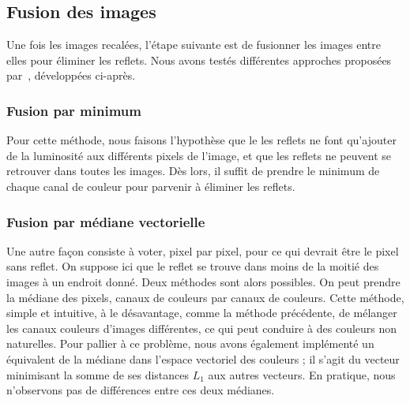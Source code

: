 \documentclass[12pt,a4paper]{article}
\begin{document}
\subsection{Fusion des images}
Une fois les images recalées, l'étape suivante est de fusionner les images entre elles pour éliminer les reflets. Nous avons testés différentes approches proposées par~\citep{haro2012photographing}, développées ci-après.
\subsubsection{Fusion par minimum}
Pour cette méthode, nous faisons l'hypothèse que le les reflets ne font qu'ajouter de la luminosité aux différents pixels de l'image, et que les reflets ne peuvent se retrouver dans toutes les images. Dès lors, il suffit de prendre le minimum de chaque canal de couleur pour parvenir à éliminer les reflets.
\subsubsection{Fusion par médiane vectorielle}
Une autre façon consiste à voter, pixel par pixel, pour ce qui devrait être le pixel sans reflet. On suppose ici que le reflet se trouve dans moins de la moitié des images à un endroit donné. Deux méthodes sont alors possibles. On peut prendre la médiane des pixels, canaux de couleurs par canaux de couleurs. Cette méthode, simple et intuitive, à le désavantage, comme la méthode précédente, de mélanger les canaux couleurs d'images différentes, ce qui peut conduire à des couleurs non naturelles. Pour pallier à ce problème, nous avons également implémenté un équivalent de la médiane dans l'espace vectoriel des couleurs ; il s'agit du vecteur minimisant la somme de ses distances $L_1$ aux autres vecteurs. En pratique, nous n'observons pas de différences entre ces deux médianes. 
\end{document}

